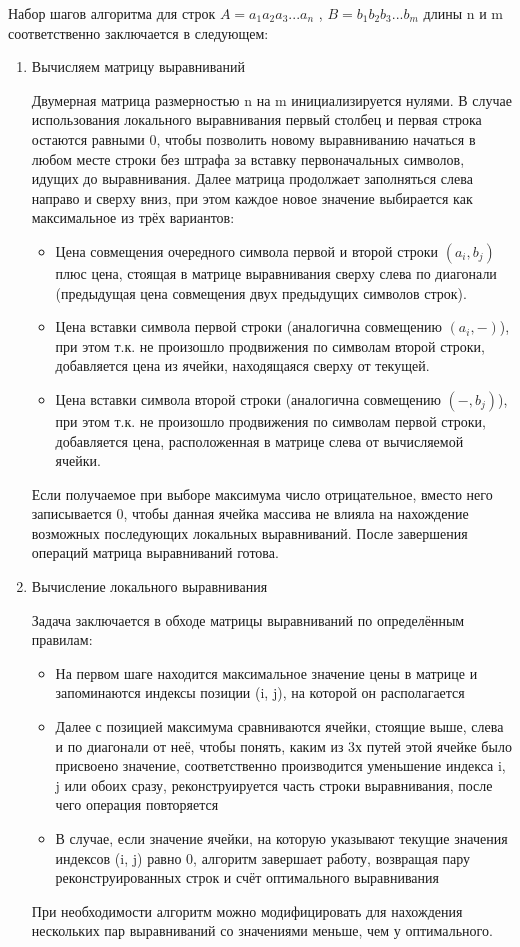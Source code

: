 Набор шагов алгоритма для строк $A = a_1 a_2 a_3 ... a_n$ , $B = b_1 b_2 b_3 ... b_m$ длины n и m соответственно заключается в следующем:
\begin {enumerate}
	\item Вычисляем матрицу выравниваний

	Двумерная матрица размерностью n на m инициализируется нулями. В случае использования локального выравнивания первый столбец и первая строка остаются равными 0, чтобы позволить новому выравниванию начаться в любом месте строки без штрафа за вставку первоначальных символов, идущих до выравнивания. Далее матрица продолжает заполняться слева направо и сверху вниз, при этом каждое новое значение выбирается как максимальное из трёх вариантов:
	\begin {itemize}
		\item Цена совмещения очередного символа первой и второй строки $(a_i, b_j)$ плюс цена, стоящая в матрице выравнивания сверху слева по диагонали (предыдущая цена совмещения двух предыдущих символов строк).
		\item Цена вставки символа первой строки (аналогична совмещению $(a_i, -)$), при этом т.к. не произошло продвижения по символам второй строки, добавляется цена из ячейки, находящаяся сверху от текущей.
		\item Цена вставки символа второй строки (аналогична совмещению $(-, b_j)$), при этом т.к. не произошло продвижения по символам первой строки, добавляется цена, расположенная в матрице слева от вычисляемой ячейки.
	\end {itemize}
	Если получаемое при выборе максимума число отрицательное, вместо него записывается 0, чтобы данная ячейка массива не влияла на нахождение возможных последующих локальных выравниваний.
	После завершения операций матрица выравниваний готова.
	\item Вычисление локального выравнивания

	Задача заключается в обходе матрицы выравниваний по определённым правилам:
	\begin {itemize}
		\item На первом шаге находится максимальное значение цены в матрице и запоминаются индексы позиции (i, j), на которой он располагается
		\item Далее с позицией максимума сравниваются ячейки, стоящие выше, слева и по диагонали от неё, чтобы понять, каким из 3х путей этой ячейке было присвоено значение, соответственно производится уменьшение индекса i, j или обоих сразу, реконструируется часть строки выравнивания, после чего операция повторяется
		\item В случае, если значение ячейки, на которую указывают текущие значения индексов (i, j) равно 0, алгоритм завершает работу, возвращая пару реконструированных строк и счёт оптимального выравнивания
	\end {itemize}
	При необходимости алгоритм можно модифицировать для нахождения нескольких пар выравниваний со значениями меньше, чем у оптимального.
\end {enumerate}
